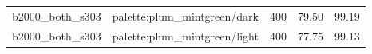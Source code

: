 \begin{longtable}{l>{\raggedright\arraybackslash}p{.42\linewidth}rrr}
b2000\_\allowbreak{}both\_\allowbreak{}s303 & %
palette:plum\_\allowbreak{}mintgreen/dark & %
400 & %
79.50 & %
99.19 \\ %

b2000\_\allowbreak{}both\_\allowbreak{}s303 & %
palette:plum\_\allowbreak{}mintgreen/light & %
400 & %
77.75 & %
99.13 \\ %


\end{longtable}
